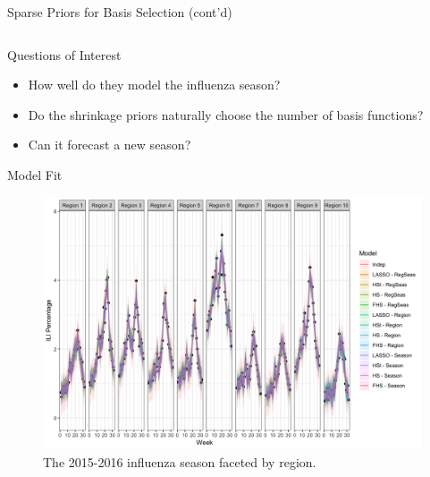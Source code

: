 \documentclass[final]{beamer}
\newlength{\onecolwid}
\newlength{\twocolwid}
\begin{document}
\begin{frame}[t]
\begin{columns}[t]
\begin{column}{\twocolwid}
\begin{columns}[t,totalwidth=\twocolwid]
\begin{column}{\onecolwid}
\begin{block}{Sparse Priors for Basis Selection (cont'd)}
\end{block}


\end{column} %

\end{columns} %


\begin{alertblock}{Questions of Interest}

\begin{itemize}
  \item How well do they model the influenza season?
  \item Do the shrinkage priors naturally choose the number of basis functions?
  \item Can it forecast a new season?
\end{itemize}

\end{alertblock} 

\begin{block}{Model Fit}
\begin{figure}
\includegraphics[width=\linewidth]{plots/ILIfit.png}
\caption{The 2015-2016 influenza season faceted by region.}
\end{figure}
\end{block}


\end{column}
\end{columns}
\end{frame}
\end{document}
